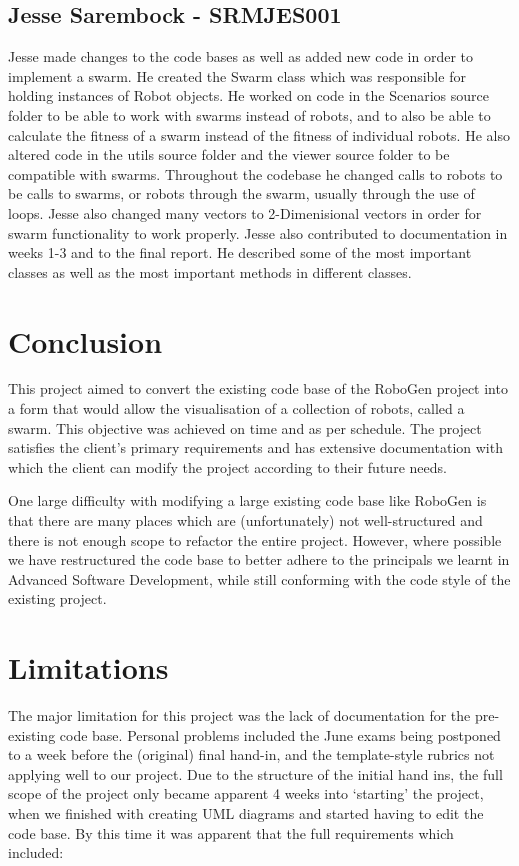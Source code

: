 \documentclass[11pt,a4paper]{article}
\begin{document}
\subsection{Jesse Sarembock - SRMJES001}

Jesse made changes to the code bases as well as added new code in order to implement a swarm.
He created the Swarm class which was responsible for holding instances of Robot objects.
He worked on code in the Scenarios source folder to be able to work with swarms instead of robots, and
to also be able to calculate the fitness of a swarm instead of the fitness of individual robots. He also altered
code in the utils source folder and the viewer source folder to be compatible with swarms. Throughout the codebase
he changed calls to robots to be calls to swarms, or robots through the swarm, usually through the use of loops.
Jesse also changed many vectors to 2-Dimenisional vectors in order for swarm functionality to work properly. Jesse
also contributed to documentation in weeks 1-3 and to the final report. He described some of the most important
classes as well as the most important methods in different classes.

\section{Conclusion}
\label{s:conclusion}
This project aimed to convert the existing code base of the RoboGen project
into a form that would allow the visualisation of a collection of robots,
called a swarm. This objective was achieved on time and as per schedule. The
project satisfies the client's primary requirements and has extensive
documentation with which the client can modify the project according to their
future needs.

One large difficulty with modifying a large existing code base like RoboGen is
that there are many places which are (unfortunately) not well-structured and
there is not enough scope to refactor the entire project. However, where
possible we have restructured the code base to better adhere to the principals
we learnt in Advanced Software Development, while still conforming with the
code style of the existing project.

\section{Limitations}
The major limitation for this project was the lack of documentation for the
pre-existing code base. Personal problems included the June exams being
postponed to a week before the (original) final hand-in, and the template-style
rubrics not applying well to our project. Due to the structure of the initial
hand ins, the full scope of the project only became apparent 4 weeks into
`starting' the project, when we finished with creating UML diagrams and started
having to edit the code base. By this time it was apparent that the full
requirements which included:
\end{document}
